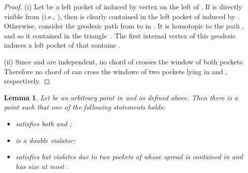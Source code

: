\documentclass[12pt]{article}
\newtheorem{lemma}{Lemma}
\begin{document}
\begin{proof}
(i) Let  be a left pocket of  induced by vertex  on the left of . If  is directly visible from  (i.e., ),
then  is clearly contained in the left pocket of  induced by .
Otherwise, consider the geodesic path from  to  in . It is homotopic to the path , and so it contained in the triangle~. The first
internal vertex of this geodesic induces a left pocket of  that contains .

(ii) Since  and  are independent, no chord of  crosses the window of both pockets. Therefore no chord of  can cross the windows of two pockets lying in
 and , respectively.
\end{proof}


\begin{lemma}\label{lem:line}
Let  be an arbitrary point in  and
 as defined above.
Then there is a point  such that one of the following statements holds:
\begin{itemize}
\item[]  satisfies both  and ;
\item[]  is a double violator;
\item[]  satisfies  but violates  due
                  to two pockets of whose spread is contained in 
                  and has size at most .
\end{itemize}
\end{lemma}
\end{document}
